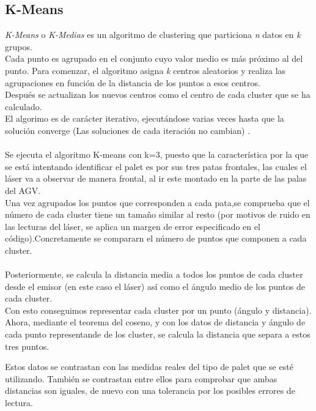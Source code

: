 		\subsection{K-Means}
		\emph{K-Means} o \emph{K-Medias} es un algoritmo de clustering que particiona \textit{n} datos en \textit{k} grupos.\\
Cada punto es agrupado en el conjunto cuyo valor medio es más próximo al del punto.
		Para comenzar, el algoritmo asigna \textit{k} centros aleatorios y realiza las agrupaciones en función de la distancia de los puntos a esos centros.\\
Después se actualizan los nuevos centros como el centro de cada cluster que se ha calculado.\\

		El algorimo es de carácter iterativo, ejecutándose varias veces hasta que la solución converge (Las soluciones de cada iteración no cambian) \cite{wiki:kmeans} .\\ \\

Se ejecuta el algoritmo K-means con k=3, puesto que la característica por la que se está intentando identificar el palet es por sus tres patas frontales, las cuales el láser va a observar de manera frontal, al ir este montado en la parte de las palas del AGV. \\
Una vez agrupados los puntos que corresponden a cada pata,se comprueba que el número de cada cluster tiene un tamaño similar al resto (por motivos de ruido en las lecturas del láser, se aplica un margen de error especificado en el código).Concretamente se compararn el número de puntos que componen a cada cluster.\\ \\
Posteriormente, se calcula la distancia media a todos los puntos de cada cluster desde el emisor (en este caso el láser) así como el ángulo medio de los puntos de cada cluster.\\
Con esto conseguimos representar cada cluster por un punto (ángulo y distancia).\\
Ahora, mediante el teorema del coseno, y con los datos de distancia y ángulo de cada punto representande de los cluster, se calcula la distancia que separa a estos tres puntos.\\


 Estos datos se contrastan con las medidas reales del tipo de palet que se esté utilizando. También se contrastan entre ellos para comprobar que ambas distancias son iguales, de nuevo con una tolerancia por los posibles errores de lectura.\\

